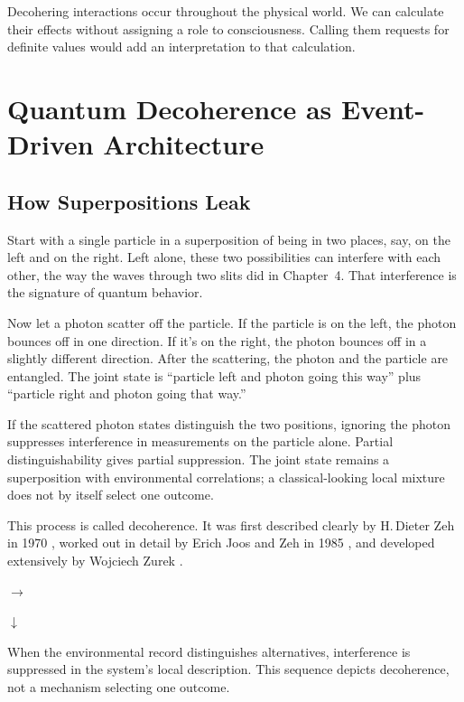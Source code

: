Decohering interactions occur throughout the physical world. We can calculate their effects without assigning a role to consciousness. Calling them requests for definite values would add an interpretation to that calculation.

\section{Quantum Decoherence as Event-Driven Architecture}

\subsection{How Superpositions Leak}

Start with a single particle in a superposition of being in two places, say, on the left and on the right. Left alone, these two possibilities can interfere with each other, the way the waves through two slits did in Chapter~4. That interference is the signature of quantum behavior.

Now let a photon scatter off the particle. If the particle is on the left, the photon bounces off in one direction. If it's on the right, the photon bounces off in a slightly different direction. After the scattering, the photon and the particle are entangled. The joint state is ``particle left and photon going this way'' plus ``particle right and photon going that way.''

If the scattered photon states distinguish the two positions, ignoring the photon suppresses interference in measurements on the particle alone. Partial distinguishability gives partial suppression. The joint state remains a superposition with environmental correlations; a classical-looking local mixture does not by itself select one outcome.

This process is called decoherence. It was first described clearly by H.\,Dieter Zeh in 1970 \cite{zeh1970}, worked out in detail by Erich Joos and Zeh in 1985 \cite{joos1985}, and developed extensively by Wojciech Zurek \cite{zurek2003}.

\begin{examplebox}
\begin{center}
\quad\(\longrightarrow\)\quad{}

\(\downarrow\)

\end{center}
When the environmental record distinguishes alternatives, interference is suppressed in the system's local description. This sequence depicts decoherence, not a mechanism selecting one outcome.
\end{examplebox}

